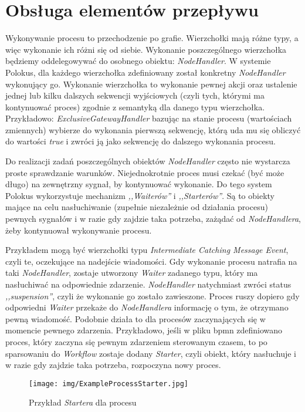 \documentclass[declaration,shortabstract,mgr]{iithesis}
\begin{document}
\section{Obsługa elementów przepływu}
Wykonywanie procesu to przechodzenie po grafie. Wierzchołki mają różne typy, a więc wykonanie ich różni się od siebie. Wykonanie poszczególnego wierzchołka będziemy oddelegowywać do osobnego obiektu: \textit{NodeHandler}. W systemie Polokus, dla każdego wierzchołka zdefiniowany został konkretny \textit{NodeHandler} wykonujący go. Wykonanie wierzchołka to wykonanie pewnej akcji oraz ustalenie jednej lub kilku dalszych sekwencji wyjściowych (czyli tych, którymi ma kontynuować proces) zgodnie z semantyką dla danego typu wierzchołka. Przykładowo: \textit{ExclusiveGatewayHandler} bazując na stanie procesu (wartościach zmiennych) wybierze do wykonania pierwszą sekwencję, którą uda mu się obliczyć do wartości \textit{true} i zwróci ją jako sekwencję do dalszego wykonania procesu.

Do realizacji zadań poszczególnych obiektów \textit{NodeHandler} często nie wystarcza proste sprawdzanie warunków. Niejednokrotnie proces musi czekać (być może długo) na zewnętrzny sygnał, by kontynuować wykonanie. Do tego system Polokus wykorzystuje mechanizm \textit{,,Waiterów''} i \textit{,,Starterów''}. Są to obiekty mające na celu nasłuchiwanie (zupełnie niezależnie od działania procesu) pewnych sygnałów i w razie gdy zajdzie taka potrzeba, zażądać od \textit{NodeHandlera}, żeby kontynuował wykonywanie procesu.

Przykładem mogą być wierzchołki typu \textit{Intermediate Catching Message Event}, czyli te, oczekujące na nadejście wiadomości. Gdy wykonanie procesu natrafia na taki \textit{NodeHandler}, zostaje utworzony \textit{Waiter} zadanego typu, który ma nasłuchiwać na odpowiednie zdarzenie. \textit{NodeHandler} natychmiast zwróci status \textit{,,suspension''}, czyli że wykonanie go zostało zawieszone. Proces ruszy dopiero gdy odpowiedni \textit{Waiter} przekaże do \textit{NodeHandlera} informację o tym, że otrzymano pewną wiadomość. Podobnie działa to dla procesów zaczynających się w momencie pewnego zdarzenia. Przykładowo, jeśli w pliku bpmn zdefiniowano proces, który zaczyna się pewnym zdarzeniem sterowanym czasem, to po sparsowaniu do \textit{Workflow} zostaje dodany \textit{Starter}, czyli obiekt, który nasłuchuje i w razie gdy zajdzie taka potrzeba, rozpoczyna nowy proces.

\begin{figure}[H]
    \texttt{[image: img/ExampleProcessStarter.jpg]}
    \caption{Przykład \textit{Startera} dla procesu}
    \label{fig:process-example-starter}
\end{figure}
\end{document}
